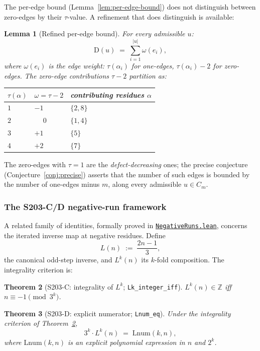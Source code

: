 \documentclass[11pt,a4paper]{article}
\theoremstyle{plain}
\newtheorem{theorem}{Theorem}[section]
\newtheorem{lemma}[theorem]{Lemma}
\theoremstyle{definition}
\newcommand{\ZZ}{\mathbb{Z}}
\newcommand{\defect}{\mathrm{D}}
\begin{document}
The per-edge bound (Lemma~\ref{lem:per-edge-bound}) does not
distinguish between zero-edges by their $\tau$-value. A refinement
that does distinguish is available:

\begin{lemma}[Refined per-edge bound]
\label{lem:refined-per-edge}
For every admissible $u$:
\[
  \defect(u) \;=\; \sum_{i=1}^{|u|} \omega(e_i),
\]
where $\omega(e_i)$ is the edge weight: $\tau(\alpha_i)$ for
one-edges, $\tau(\alpha_i) - 2$ for zero-edges. The
zero-edge contributions $\tau - 2$ partition as:
\begin{center}\small
\begin{tabular}{lll}
\toprule
$\tau(\alpha)$ & $\omega = \tau - 2$ & contributing residues $\alpha$ \\
\midrule
$1$ & $-1$ & $\{2, 8\}$ \\
$2$ & $\phantom{+}0$ & $\{1, 4\}$ \\
$3$ & $+1$ & $\{5\}$ \\
$4$ & $+2$ & $\{7\}$ \\
\bottomrule
\end{tabular}
\end{center}
\end{lemma}

The zero-edges with $\tau = 1$ are the \emph{defect-decreasing}
ones; the precise conjecture (Conjecture~\ref{conj:precise})
asserts that the number of such edges is bounded by the number of
one-edges minus $m$, along every admissible $u \in C_m$.

\subsubsection*{The S203-C/D negative-run framework}

A related family of identities, formally proved in
\href{run:CollatzLean4/CollatzLean4/NegativeRuns.lean}%
{\texttt{NegativeRuns.lean}}, concerns the iterated
inverse map at negative residues. Define
\[
  L(n) \;:=\; \frac{2 n - 1}{3},
\]
the canonical odd-step inverse, and $L^k(n)$ its $k$-fold
composition. The integrality criterion is:

\begin{theorem}[S203-C: integrality of $L^k$;
\texttt{Lk\_integer\_iff}]
\label{thm:s203-C}
$L^k(n) \in \ZZ$ iff $n \equiv -1 \pmod{3^k}$.
\end{theorem}

\begin{theorem}[S203-D: explicit numerator;
\texttt{Lnum\_eq}]
\label{thm:s203-D}
Under the integrality criterion of Theorem~\ref{thm:s203-C},
\[
   3^k \cdot L^k(n) \;=\; \mathrm{Lnum}(k, n),
\]
where $\mathrm{Lnum}(k, n)$ is an explicit polynomial expression
in $n$ and $2^k$.
\end{theorem}
\end{document}
